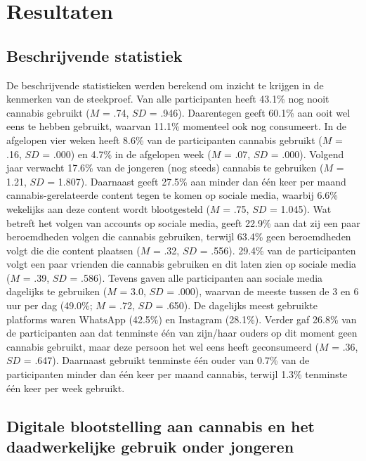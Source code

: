 \documentclass[
  letterpaper,
  DIV=11,
  numbers=noendperiod]{scrartcl}
\begin{document}
\hypertarget{resultaten}{%
\section{Resultaten}\label{resultaten}}

\hypertarget{beschrijvende-statistiek}{%
\subsection{Beschrijvende statistiek}\label{beschrijvende-statistiek}}

De beschrijvende statistieken werden berekend om inzicht te krijgen in
de kenmerken van de steekproef. Van alle participanten heeft 43.1\% nog
nooit cannabis gebruikt (\(M\) = .74, \(SD\) = .946). Daarentegen geeft
60.1\% aan ooit wel eens te hebben gebruikt, waarvan 11.1\% momenteel
ook nog consumeert. In de afgelopen vier weken heeft 8.6\% van de
participanten cannabis gebruikt (\(M\) = .16, \(SD\) = .000) en 4.7\% in
de afgelopen week (\(M\) = .07, \(SD\) = .000). Volgend jaar verwacht
17.6\% van de jongeren (nog steeds) cannabis te gebruiken (\(M\) = 1.21,
\(SD\) = 1.807). Daarnaast geeft 27.5\% aan minder dan één keer per
maand cannabis-gerelateerde content tegen te komen op sociale media,
waarbij 6.6\% wekelijks aan deze content wordt blootgesteld (\(M\) =
.75, \(SD\) = 1.045). Wat betreft het volgen van accounts op sociale
media, geeft 22.9\% aan dat zij een paar beroemdheden volgen die
cannabis gebruiken, terwijl 63.4\% geen beroemdheden volgt die die
content plaatsen (\(M\) = .32, \(SD\) = .556). 29.4\% van de
participanten volgt een paar vrienden die cannabis gebruiken en dit
laten zien op sociale media (\(M\) = .39, \(SD\) = .586). Tevens gaven
alle participanten aan sociale media dagelijks te gebruiken (\(M\) =
3.0, \(SD\) = .000), waarvan de meeste tussen de 3 en 6 uur per dag
(49.0\%; \(M\) = .72, \(SD\) = .650). De dagelijks meest gebruikte
platforms waren WhatsApp (42.5\%) en Instagram (28.1\%). Verder gaf
26.8\% van de participanten aan dat tenminste één van zijn/haar ouders
op dit moment geen cannabis gebruikt, maar deze persoon het wel eens
heeft geconsumeerd (\(M\) = .36, \(SD\) = .647). Daarnaast gebruikt
tenminste één ouder van 0.7\% van de participanten minder dan één keer
per maand cannabis, terwijl 1.3\% tenminste één keer per week gebruikt.

\hypertarget{digitale-blootstelling-aan-cannabis-en-het-daadwerkelijke-gebruik-onder-jongeren}{%
\subsection{Digitale blootstelling aan cannabis en het daadwerkelijke
gebruik onder
jongeren}\label{digitale-blootstelling-aan-cannabis-en-het-daadwerkelijke-gebruik-onder-jongeren}}
\end{document}
